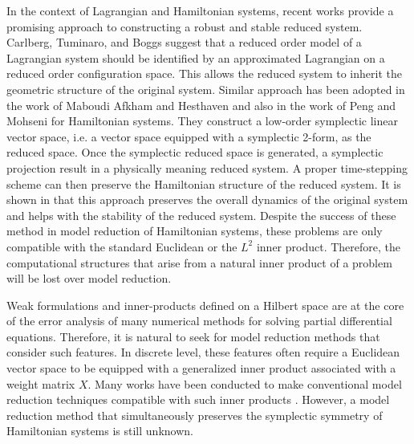 In the context of Lagrangian and Hamiltonian systems, recent works provide a promising approach to constructing a robust and stable reduced system. Carlberg, Tuminaro, and Boggs \cite{Carlberg:2014ky} suggest that a reduced order model of a Lagrangian system should be identified by an approximated Lagrangian on a reduced order configuration space. This allows the reduced system to inherit the geometric structure of the original system. Similar approach has been adopted in the work of Maboudi Afkham and Hesthaven \cite{doi:10.1137/17M1111991} and also in the work of Peng and Mohseni \cite{doi:10.1137/140978922} for Hamiltonian systems. They construct a low-order symplectic linear vector space, i.e. a vector space equipped with a symplectic 2-form, as the reduced space. Once the symplectic reduced space is generated, a symplectic projection result in a physically meaning reduced system. A proper time-stepping scheme can then preserve the Hamiltonian structure of the reduced system. It is shown in \cite{doi:10.1137/17M1111991,doi:10.1137/140978922} that this approach preserves the overall dynamics of the original system and helps with the stability of the reduced system. Despite the success of these method in model reduction of Hamiltonian systems, these problems are only compatible with the standard Euclidean or the $L^2$ inner product. Therefore, the computational structures that arise from a natural inner product of a problem will be lost over model reduction.

Weak formulations and inner-products defined on a Hilbert space are at the core of the error analysis of many numerical methods for solving partial differential equations. Therefore, it is natural to seek for model reduction methods that consider such features. In discrete level, these features often require a Euclidean vector space to be equipped with a generalized inner product associated with a weight matrix $X$. Many works have been conducted to make conventional model reduction techniques compatible with such inner products \cite{sen2006natural}. However, a model reduction method that simultaneously preserves the symplectic symmetry of Hamiltonian systems is still unknown. 

